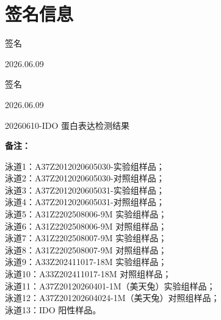 \documentclass[UTF8,10pt,a4paper,fontset=fandol]{ctexart}
\newcommand{\fieldvalue}[1]{#1}
\newcommand{\handwritten}[1]{#1}
\begin{document}
\section*{签名信息}

\fieldvalue{\handwritten{签名}}

\fieldvalue{\handwritten{2026.06.09}}

\fieldvalue{\handwritten{签名}}

\fieldvalue{\handwritten{2026.06.09}}

\newpage

\begin{center}
20260610-IDO 蛋白表达检测结果
\end{center}

\begin{center}
\begin{minipage}{0.92\linewidth}
\centering
\end{minipage}
\end{center}

\noindent
\textbf{备注：}

\begin{flushleft}
泳道1：A37Z2012020605030-实验组样品；\\
泳道2：A37Z2012020605030-对照组样品；\\
泳道3：A37Z2012020605031-实验组样品；\\
泳道4：A37Z2012020605031-对照组样品；\\
泳道5：A31Z2202508006-9M 实验组样品；\\
泳道6：A31Z2202508006-9M 对照组样品；\\
泳道7：A31Z2202508007-9M 实验组样品；\\
泳道8：A31Z2202508007-9M 对照组样品；\\
泳道9：A33Z202411017-18M 实验组样品；\\
泳道10：A33Z202411017-18M 对照组样品；\\
泳道11：A37Z20120260401-1M（美天兔）实验组样品；\\
泳道12：A37Z201202604024-1M（美天兔）对照组样品；\\
泳道13：IDO 阳性样品。
\end{flushleft}
\end{document}
